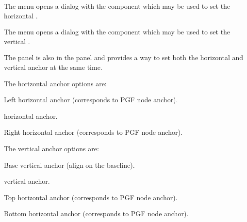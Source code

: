 
The  menu opens a dialog
with the  component which may be used to set the
horizontal .


The  menu opens a dialog
with the  component which may be used to set the
vertical .


The  panel is also in the 
panel and provides a way to set both the horizontal and vertical
anchor at the same time. 


The horizontal anchor options are:

\begin{deflist}
\begin{itemdesc}
Left horizontal anchor (corresponds to PGF node  anchor).
\end{itemdesc}

\begin{itemdesc}
 horizontal anchor.
\end{itemdesc}

\begin{itemdesc}
Right horizontal anchor (corresponds to PGF node  anchor).
\end{itemdesc}

\end{deflist}


The vertical anchor options are:

\begin{deflist}
\begin{itemdesc}
Base vertical anchor (align on the baseline).
\end{itemdesc}

\begin{itemdesc}
 vertical anchor.
\end{itemdesc}

\begin{itemdesc}
Top horizontal anchor (corresponds to PGF node  anchor).
\end{itemdesc}

\begin{itemdesc}
Bottom horizontal anchor (corresponds to PGF node  anchor).
\end{itemdesc}

\end{deflist}

